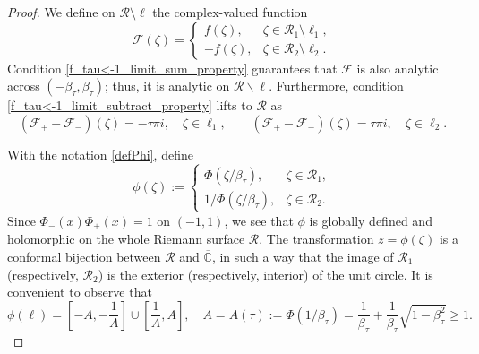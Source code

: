 \documentclass[reqno,11pt]{amsart}
\theoremstyle{plain}
\theoremstyle{definition}
\theoremstyle{remark}
\numberwithin{equation}{section}
\newcommand{\C}{\mathbb{C}}
\begin{document}
\begin{proof}
    We define on $\mathcal R\setminus \ell$ the complex-valued function
    \begin{equation*}\label{F_tau<-1}
      \mathcal  F(\zeta)=\begin{cases}
            f(\zeta), &  \zeta\in\mathcal{R}_1 \setminus \ell_1, \\
                 -f(\zeta), &   \zeta\in\mathcal{R}_2 \setminus \ell_2.
              \end{cases}
    \end{equation*}
    Condition \eqref{f_tau<-1_limit_sum_property} guarantees that $\mathcal F$ is also analytic across $(-\beta_\tau,\beta_\tau)$; thus, it is analytic on $\mathcal{R}\backslash \ell$. Furthermore, condition \eqref{f_tau<-1_limit_subtract_property} lifts to $\mathcal R$ as 
    \begin{equation}
        \label{bdrycondonR}
    (\mathcal F_+-\mathcal F_-)(\zeta)=-\tau\pi i, \quad \zeta\in \ell_1, \qquad  (\mathcal F_+-\mathcal F_-)(\zeta)=\tau\pi i, \quad \zeta\in \ell_2.
    \end{equation}

   With the notation \eqref{defPhi}, define
    \begin{equation*}\label{varphi}
         \phi(\zeta):=\begin{cases}
             \Phi(\zeta/\beta_\tau), & \zeta\in \mathcal R_1, \\
            1/ \Phi(\zeta/\beta_\tau), & \zeta\in \mathcal R_2.
         \end{cases}
    \end{equation*}
    Since $\Phi_-(x)\Phi_+(x)=1$ on $(-1,1)$, we see that $\phi$ is globally defined and holomorphic on the whole Riemann surface $\mathcal R$. The transformation $z=\phi(\zeta)$ is a conformal bijection between  $\mathcal R$ and $\overline{\C}$, in such a way that the image of $\mathcal R_1$ (respectively, $\mathcal R_2$) is the exterior (respectively, interior) of the unit circle.
     It is convenient to observe that
     \begin{equation}
         \label{imagebyPhi}
         \phi(\ell) = \left[-A,-\frac{1}{A}\right]\cup \left[\frac{1}{A},A\right], \quad   A=A(\tau):=\Phi(1/\beta_\tau)=\frac{1}{\beta_\tau}+\frac{1}{\beta_\tau}\sqrt{1-\beta_\tau^2}\geq1. 
     \end{equation}
    

\end{proof}
\end{document}

